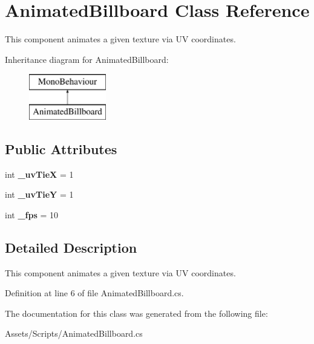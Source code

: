 \hypertarget{class_animated_billboard}{\section{Animated\+Billboard Class Reference}
\label{class_animated_billboard}
}


This component animates a given texture via U\+V coordinates.  


Inheritance diagram for Animated\+Billboard\+:\begin{figure}[H]
\begin{center}
\leavevmode
\includegraphics[height=2.000000cm]{class_animated_billboard}
\end{center}
\end{figure}
\subsection*{Public Attributes}
\begin{DoxyCompactItemize}
\item 
\hypertarget{class_animated_billboard_a10edd130c334ea6aa0444c3338e65d8c}{int {\bfseries \+\_\+uv\+Tie\+X} = 1}\label{class_animated_billboard_a10edd130c334ea6aa0444c3338e65d8c}

\item 
\hypertarget{class_animated_billboard_a059abeaabfc49d03b412947b44397bc7}{int {\bfseries \+\_\+uv\+Tie\+Y} = 1}\label{class_animated_billboard_a059abeaabfc49d03b412947b44397bc7}

\item 
\hypertarget{class_animated_billboard_a521d074d952fea3d579e4a8b40ac91ea}{int {\bfseries \+\_\+fps} = 10}\label{class_animated_billboard_a521d074d952fea3d579e4a8b40ac91ea}

\end{DoxyCompactItemize}


\subsection{Detailed Description}
This component animates a given texture via U\+V coordinates. 



Definition at line 6 of file Animated\+Billboard.\+cs.



The documentation for this class was generated from the following file\+:\begin{DoxyCompactItemize}
\item 
Assets/\+Scripts/Animated\+Billboard.\+cs\end{DoxyCompactItemize}
